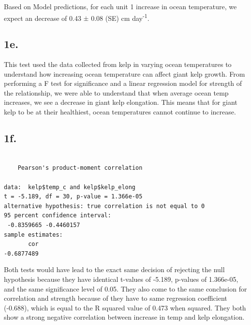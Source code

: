 \documentclass[
  letterpaper,
  DIV=11,
  numbers=noendperiod]{scrartcl}
\newenvironment{Shaded}{\begin{snugshade}}{\end{snugshade}}
\newcommand{\AttributeTok}[1]{\textcolor[rgb]{0.40,0.45,0.13}{#1}}
\newcommand{\CommentTok}[1]{\textcolor[rgb]{0.37,0.37,0.37}{#1}}
\newcommand{\FunctionTok}[1]{\textcolor[rgb]{0.28,0.35,0.67}{#1}}
\newcommand{\NormalTok}[1]{\textcolor[rgb]{0.00,0.23,0.31}{#1}}
\newcommand{\OtherTok}[1]{\textcolor[rgb]{0.00,0.23,0.31}{#1}}
\newcommand{\SpecialCharTok}[1]{\textcolor[rgb]{0.37,0.37,0.37}{#1}}
\newcommand{\StringTok}[1]{\textcolor[rgb]{0.13,0.47,0.30}{#1}}
\begin{document}
Based on Model predictions, for each unit 1 increase in ocean
temperature, we expect an decrease of 0.43 \(\pm\) 0.08 (SE) cm
day\textsuperscript{-1}.

\subsection{1e.}\label{e.}

This test used the data collected from kelp in varying ocean
temperatures to understand how increasing ocean temperature can affect
giant kelp growth. From performing a F test for significance and a
linear regression model for strength of the relationship, we were able
to understand that when average ocean temp increases, we see a decrease
in giant kelp elongation. This means that for giant kelp to be at their
healthiest, ocean temperatures cannot continue to increase.

\subsection{1f.}\label{f.}

\begin{Shaded}
\end{Shaded}

\begin{verbatim}

    Pearson's product-moment correlation

data:  kelp$temp_c and kelp$kelp_elong
t = -5.189, df = 30, p-value = 1.366e-05
alternative hypothesis: true correlation is not equal to 0
95 percent confidence interval:
 -0.8359665 -0.4460157
sample estimates:
       cor 
-0.6877489 
\end{verbatim}

Both tests would have lead to the exact same decision of rejecting the
null hypothesis because they have identical t-values of -5.189, p-values
of 1.366e-05, and the same significance level of 0.05. They also come to
the same conclusion for correlation and strength because of they have to
same regression coefficient (-0.688), which is equal to the R squared
value of 0.473 when squared. They both show a strong negative
correlation between increase in temp and kelp elongation.
\end{document}
